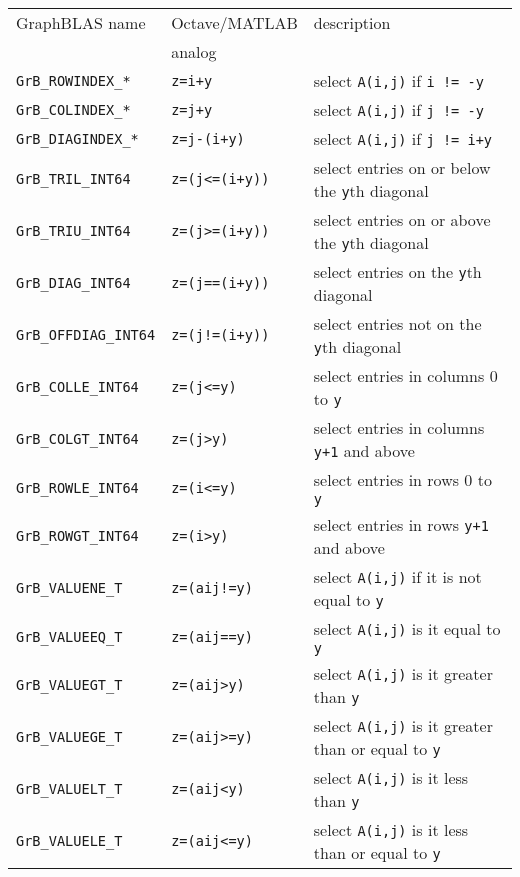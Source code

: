 \documentclass[12pt]{article}
\begin{document}
\vspace{0.2in}
\noindent
{\footnotesize
\begin{tabular}{lll}
\hline
GraphBLAS name          & Octave/MATLAB     & description \\
                        & analog            & \\
\hline
\verb'GrB_ROWINDEX_*'    & \verb'z=i+y'         & select \verb'A(i,j)' if \verb'i != -y' \\
\verb'GrB_COLINDEX_*'    & \verb'z=j+y'         & select \verb'A(i,j)' if \verb'j != -y' \\
\verb'GrB_DIAGINDEX_*'   & \verb'z=j-(i+y)'     & select \verb'A(i,j)' if \verb'j != i+y' \\
\hline
\verb'GrB_TRIL_INT64'    & \verb'z=(j<=(i+y))'  & select entries on or below the \verb'y'th diagonal \\
\verb'GrB_TRIU_INT64'    & \verb'z=(j>=(i+y))'  & select entries on or above the \verb'y'th diagonal \\
\verb'GrB_DIAG_INT64'    & \verb'z=(j==(i+y))'  & select entries on the \verb'y'th diagonal \\
\verb'GrB_OFFDIAG_INT64' & \verb'z=(j!=(i+y))'  & select entries not on the \verb'y'th diagonal \\
\verb'GrB_COLLE_INT64'   & \verb'z=(j<=y)'      & select entries in columns 0 to \verb'y' \\
\verb'GrB_COLGT_INT64'   & \verb'z=(j>y)'       & select entries in columns \verb'y+1' and above \\
\verb'GrB_ROWLE_INT64'   & \verb'z=(i<=y)'      & select entries in rows 0 to \verb'y' \\
\verb'GrB_ROWGT_INT64'   & \verb'z=(i>y)'       & select entries in rows \verb'y+1' and above \\
\hline
\verb'GrB_VALUENE_T'     & \verb'z=(aij!=y)'    & select \verb'A(i,j)' if it is not equal to \verb'y'\\
\verb'GrB_VALUEEQ_T'     & \verb'z=(aij==y)'    & select \verb'A(i,j)' is it equal to \verb'y'\\
\verb'GrB_VALUEGT_T'     & \verb'z=(aij>y)'     & select \verb'A(i,j)' is it greater than \verb'y' \\
\verb'GrB_VALUEGE_T'     & \verb'z=(aij>=y)'    & select \verb'A(i,j)' is it greater than or equal to \verb'y' \\
\verb'GrB_VALUELT_T'     & \verb'z=(aij<y)'     & select \verb'A(i,j)' is it less than \verb'y' \\
\verb'GrB_VALUELE_T'     & \verb'z=(aij<=y)'    & select \verb'A(i,j)' is it less than or equal to \verb'y' \\
%
\hline
\end{tabular}
}
\vspace{0.2in}
\end{document}
